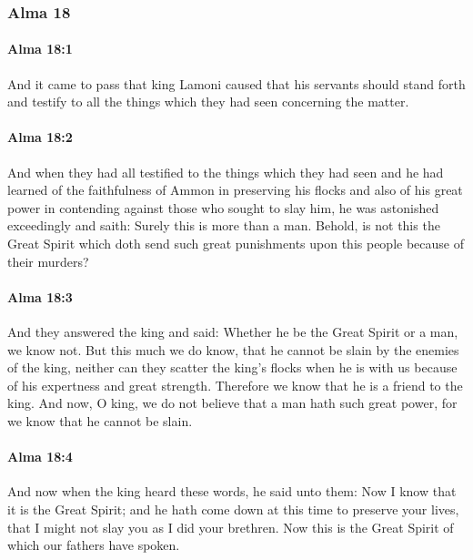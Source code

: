 	\subsubsection{Alma 18} %
		\label{ALMA-18}
		
		\paragraph{Alma 18:1} %
			\label{ALMA-18-1}

			And it came to pass that king Lamoni caused
			that his servants should stand forth and testify to all the things
			which they had seen concerning the matter.

		\paragraph{Alma 18:2} %
			\label{ALMA-18-2}

			And when they had all testified to the things which they had seen
			and he had learned of the faithfulness of Ammon in preserving his flocks
			and also of his great power in contending against those who sought to slay him,
			he was astonished exceedingly and saith:
			Surely this is more than a man.
			Behold, is not this the Great Spirit
			which doth send such great punishments upon this people
			because of their murders?

		\paragraph{Alma 18:3} %
			\label{ALMA-18-3}

			And they answered the king and said:
			Whether he be the Great Spirit or a man, we know not.
			But this much we do know,
			that he cannot be slain by the enemies of the king,
			neither can they scatter the king's flocks when he is with us
			because of his expertness and great strength.
			Therefore we know that he is a friend to the king.
			And now, O king, we do not believe that a man hath such great power,
			for we know that he cannot be slain.

		\paragraph{Alma 18:4} %
			\label{ALMA-18-4}

			And now when the king heard these words,
			he said unto them:
			Now I know that it is the Great Spirit;
			and he hath come down at this time to preserve your lives,
			that I might not slay you as I did your brethren.
			Now this is the Great Spirit of which our fathers have spoken.

